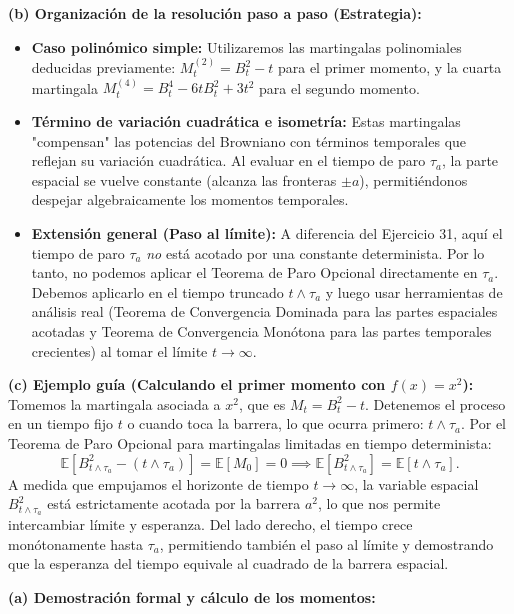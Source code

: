 \documentclass[11pt, letterpaper]{article}
\begin{document}
\begin{solucion}
    \textbf{(b) Organización de la resolución paso a paso (Estrategia):}
    \begin{itemize}
        \item[(i)] \textbf{Caso polinómico simple:} Utilizaremos las martingalas polinomiales deducidas previamente: $M^{(2)}_t = B_t^2 - t$ para el primer momento, y la cuarta martingala $M^{(4)}_t = B_t^4 - 6tB_t^2 + 3t^2$ para el segundo momento.
        \item[(ii)] \textbf{Término de variación cuadrática e isometría:} Estas martingalas "compensan" las potencias del Browniano con términos temporales que reflejan su variación cuadrática. Al evaluar en el tiempo de paro $\tau_a$, la parte espacial se vuelve constante (alcanza las fronteras $\pm a$), permitiéndonos despejar algebraicamente los momentos temporales.
        \item[(iii)] \textbf{Extensión general (Paso al límite):} A diferencia del Ejercicio 31, aquí el tiempo de paro $\tau_a$ \textit{no} está acotado por una constante determinista. Por lo tanto, no podemos aplicar el Teorema de Paro Opcional directamente en $\tau_a$. Debemos aplicarlo en el tiempo truncado $t \wedge \tau_a$ y luego usar herramientas de análisis real (Teorema de Convergencia Dominada para las partes espaciales acotadas y Teorema de Convergencia Monótona para las partes temporales crecientes) al tomar el límite $t \to \infty$.
    \end{itemize}

    \vspace{3mm}
    \textbf{(c) Ejemplo guía (Calculando el primer momento con $f(x) = x^2$):}
    Tomemos la martingala asociada a $x^2$, que es $M_t = B_t^2 - t$.
    Detenemos el proceso en un tiempo fijo $t$ o cuando toca la barrera, lo que ocurra primero: $t \wedge \tau_a$.
    Por el Teorema de Paro Opcional para martingalas limitadas en tiempo determinista:
    \[ \mathbb{E}[B_{t \wedge \tau_a}^2 - (t \wedge \tau_a)] = \mathbb{E}[M_0] = 0 \implies \mathbb{E}[B_{t \wedge \tau_a}^2] = \mathbb{E}[t \wedge \tau_a]. \]
    A medida que empujamos el horizonte de tiempo $t \to \infty$, la variable espacial $B_{t \wedge \tau_a}^2$ está estrictamente acotada por la barrera $a^2$, lo que nos permite intercambiar límite y esperanza. Del lado derecho, el tiempo crece monótonamente hasta $\tau_a$, permitiendo también el paso al límite y demostrando que la esperanza del tiempo equivale al cuadrado de la barrera espacial.

    \vspace{3mm}
    \textbf{(a) Demostración formal y cálculo de los momentos:}


\end{solucion}
\end{document}
